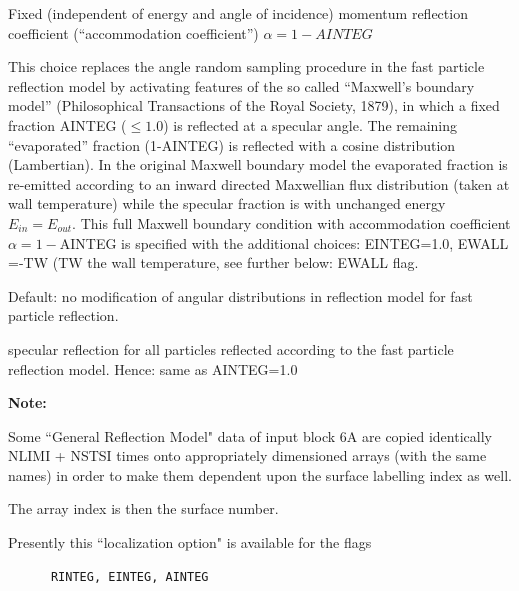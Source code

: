 \begin{description}
\begin{description}
                Fixed (independent of energy and angle of incidence) momentum reflection
                coefficient (``accommodation coefficient'') $\alpha = 1-AINTEG$

                This choice replaces the angle random sampling procedure in the fast particle
                reflection model by activating features of the so called ``Maxwell's boundary
                model'' (Philosophical Transactions of the Royal Society, 1879), in which a
                fixed fraction AINTEG ($\leq 1.0$) is reflected at a specular angle.
                The remaining ``evaporated'' fraction (1-AINTEG) is reflected with a cosine
                distribution (Lambertian).
                In the original Maxwell boundary model the evaporated fraction is re-emitted
                according to an inward directed Maxwellian flux distribution (taken at wall
                temperature) while the specular fraction is with unchanged energy $E_{in} =
                  E_{out}$.
                This full Maxwell boundary condition with accommodation coefficient
                $\alpha=1-$AINTEG is specified with the additional choices:
                EINTEG=1.0, EWALL =-TW (TW the wall temperature, see further below: EWALL flag.

          \item[$= 0$] Default:
                no modification of angular distributions in reflection model
                for
                fast particle reflection.
          \item[$< 0$] specular reflection for all particles reflected according to the
                fast particle reflection model.
                Hence: same as AINTEG=1.0
        \end{description}
\end{description}

\textbf{Note:} 

Some ``General Reflection Model" data of input block 6A are copied identically
NLIMI + NSTSI times onto appropriately dimensioned arrays (with the same names)
in order to make them dependent upon the surface labelling index as well.

The array index is then the surface number.

Presently this ``localization option" is available for the flags

\begin{lstlisting}
      RINTEG, EINTEG, AINTEG
\end{lstlisting} 

